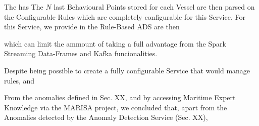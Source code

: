 The has 
The $N$ last Behavioural Points stored for each Vessel are then parsed on the Configurable Rules which are completely configurable for this Service. For this Service, we provide  in the Rule-Based ADS are then 

which can limit the ammount of taking a full advantage from the Spark Streaming Data-Frames and Kafka funcionalities.

Despite being possible to create a fully configurable Service that would manage rules, and 

From the anomalies defined in Sec. XX, and by accessing Maritime Expert Knowledge via the MARISA project, we concluded that, apart from the Anomalies detected by the Anomaly Detection Service (Sec. XX), 
\fi



